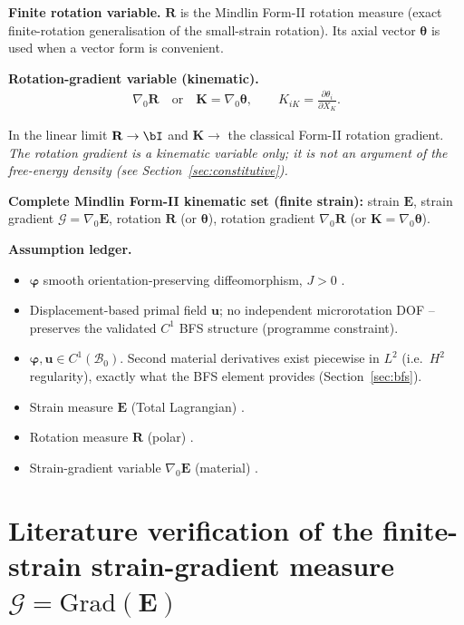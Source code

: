 \documentclass[11pt]{article}
\newcommand{\gradz}{\nabla_{0}}
\newcommand{\bp}{\boldsymbol{\varphi}}
\newcommand{\bu}{\mathbf{u}}
\newcommand{\bE}{\mathbf{E}}
\newcommand{\bR}{\mathbf{R}}
\newcommand{\gradz}{\nabla_{0}}
\newcommand{\bp}{\boldsymbol{\varphi}}
\newcommand{\bu}{\mathbf{u}}
\newcommand{\bE}{\mathbf{E}}
\newcommand{\bR}{\mathbf{R}}
\newcommand{\bth}{\boldsymbol{\theta}}
\newcommand{\bK}{\mathbf{K}}
\begin{document}
\textbf{Finite rotation variable.} $\bR$ is the Mindlin Form-II
rotation measure (exact finite-rotation generalisation of the
small-strain rotation). Its axial vector $\bth$ is used when a vector
form is convenient.

\textbf{Rotation-gradient variable (kinematic).}
\begin{align}
\gradz\bR \quad\text{or}\quad \bK=\gradz\bth,\qquad
K_{iK}=\frac{\partial\theta_{i}}{\partial X_{K}}.
\label{eq:n_rotgrad}
\end{align}

In the linear limit $\bR\to\bI$ and $\bK\to$ the classical Form-II
rotation gradient. \emph{The rotation gradient is a kinematic variable
only; it is not an argument of the free-energy density (see Section~\ref{sec:constitutive}).}

\textbf{Complete Mindlin Form-II kinematic set (finite strain):}
strain $\bE$, strain gradient $\bm{\mathcal{G}}=\gradz\bE$, rotation
$\bR$ (or $\bth$), rotation gradient $\gradz\bR$ (or
$\bK=\gradz\bth$).

\textbf{Assumption ledger.}
\begin{itemize}
\item[A1] $\bp$ smooth orientation-preserving diffeomorphism, $J>0$
\cite{Holzapfel2000,BonetWood2008}.

\item[A2] Displacement-based primal field $\bu$; no independent
microrotation DOF -- preserves the validated $C^{1}$ BFS structure
(programme constraint).

\item[A3] $\bp,\bu\in C^{1}(\mathcal{B}_{0})$. Second material
derivatives exist piecewise in $L^{2}$ (i.e.\ $H^{2}$ regularity),
exactly what the BFS element provides (Section~\ref{sec:bfs}).

\item[A4] Strain measure $\bE$ (Total Lagrangian)
\cite{Holzapfel2000,SimoHughes1998,BonetWood2008}.

\item[A5] Rotation measure $\bR$ (polar) \cite{Holzapfel2000}.

\item[A6] Strain-gradient variable $\gradz\bE$ (material)
\cite{Beheshti2016,Mindlin1964}.
\end{itemize}

\section{Literature verification of the finite-strain strain-gradient
measure $\bm{\mathcal{G}}=\mathrm{Grad}(\mathbf{E})$}
\label{sec:Gverify}
\end{document}
